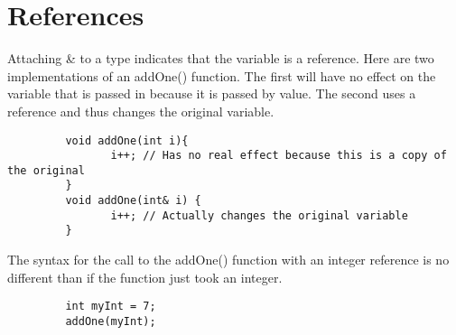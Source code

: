 \documentclass{article}
\begin{document}
\section{References}
Attaching \& to a type indicates that the variable is a reference. Here are two implementations of an
addOne() function. The first will have no effect on the variable that is passed in because it is passed
by value. The second uses a reference and thus changes the original variable.
\begin{verbatim}
         void addOne(int i){
                i++; // Has no real effect because this is a copy of the original
         }
         void addOne(int& i) {
                i++; // Actually changes the original variable
         }
\end{verbatim}
The syntax for the call to the addOne() function with an integer reference is no different than if
the function just took an integer.
\begin{verbatim}
         int myInt = 7;
         addOne(myInt);
\end{verbatim}
\end{document}
